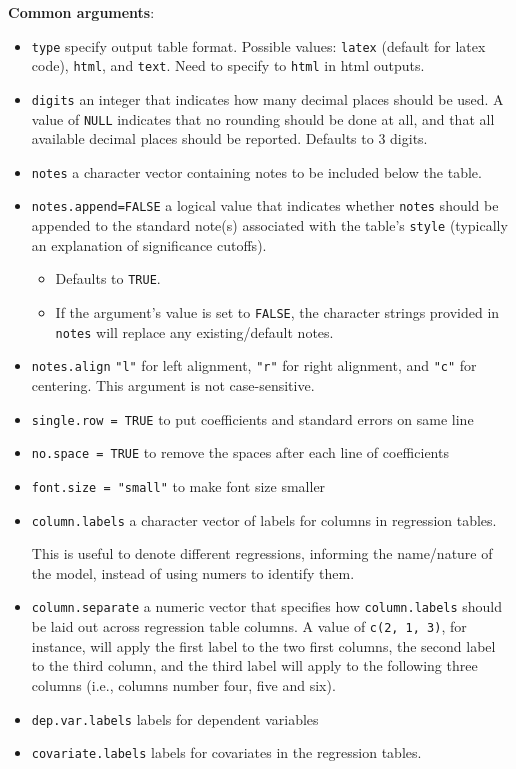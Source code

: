 \documentclass[
  a4paper,
  twoside,
  openright]{book}
\providecommand{\tightlist}{%
  \setlength{\itemsep}{0pt}\setlength{\parskip}{0pt}}
\theoremstyle{definition}
\theoremstyle{definition}
\theoremstyle{definition}
\theoremstyle{definition}
\theoremstyle{remark}
\begin{document}
\textbf{Common arguments}:

\begin{itemize}
\item
  \texttt{type} specify output table format. Possible values: \texttt{latex} (default for latex code), \texttt{html}, and \texttt{text}. Need to specify to \texttt{html} in html outputs.
\item
  \texttt{digits} an integer that indicates how many decimal places should be used. A value of \texttt{NULL} indicates that no rounding should be done at all, and that all available decimal places should be reported. Defaults to 3 digits.
\item
  \texttt{notes} a character vector containing notes to be included below the table.
\item
  \texttt{notes.append=FALSE} a logical value that indicates whether \texttt{notes} should be appended to the standard note(s) associated with the table's \texttt{style} (typically an explanation of significance cutoffs).

  \begin{itemize}
  \tightlist
  \item
    Defaults to \texttt{TRUE}.
  \item
    If the argument's value is set to \texttt{FALSE}, the character strings provided in \texttt{notes} will replace any existing/default notes.
  \end{itemize}
\item
  \texttt{notes.align} \texttt{"l"} for left alignment, \texttt{"r"} for right alignment, and \texttt{"c"} for centering. This argument is not case-sensitive.
\item
  \texttt{single.row\ =\ TRUE} to put coefficients and standard errors on same line
\item
  {\texttt{no.space\ =\ TRUE}} to remove the spaces after each line of coefficients
\item
  \texttt{font.size\ =\ "small"} to make font size smaller
\item
  {\texttt{column.labels}} a character vector of labels for columns in regression tables.

  This is useful to denote different regressions, informing the name/nature of the model, instead of using numers to identify them.
\item
  \texttt{column.separate} a numeric vector that specifies how \texttt{column.labels} should be laid out across regression table columns. A value of \texttt{c(2,\ 1,\ 3)}, for instance, will apply the first label to the two first columns, the second label to the third column, and the third label will apply to the following three columns (i.e., columns number four, five and six).
\item
  \texttt{dep.var.labels} labels for dependent variables
\item
  {\texttt{covariate.labels}} labels for covariates in the regression tables.


\end{itemize}
\end{document}
